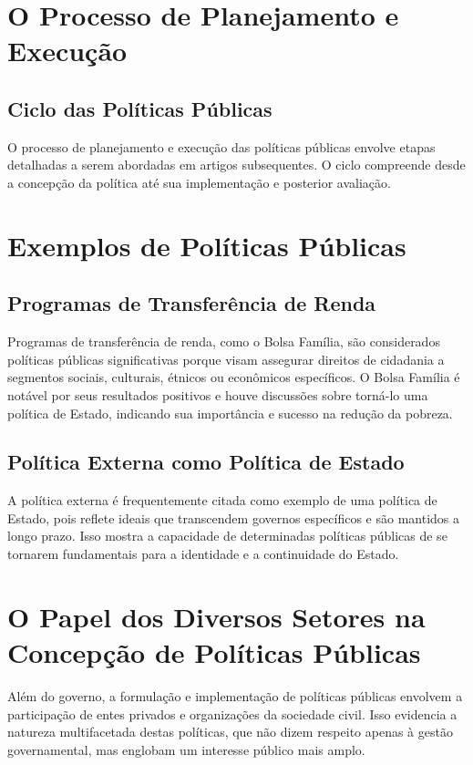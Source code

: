 \documentclass[
   article,       
   12pt,          
   oneside,       
   a4paper,       
   english,       
   brazil,        
   sumario=tradicional
   ]{abntex2}
\begin{document}
\section{O Processo de Planejamento e Execução}
\subsection{Ciclo das Políticas Públicas}
O processo de planejamento e execução das políticas públicas envolve etapas detalhadas a serem abordadas em artigos subsequentes. O ciclo compreende desde a concepção da política até sua implementação e posterior avaliação.

\section{Exemplos de Políticas Públicas}
\subsection{Programas de Transferência de Renda}
Programas de transferência de renda, como o Bolsa Família, são considerados políticas públicas significativas porque visam assegurar direitos de cidadania a segmentos sociais, culturais, étnicos ou econômicos específicos. O Bolsa Família é notável por seus resultados positivos e houve discussões sobre torná-lo uma política de Estado, indicando sua importância e sucesso na redução da pobreza.

\subsection{Política Externa como Política de Estado}
A política externa é frequentemente citada como exemplo de uma política de Estado, pois reflete ideais que transcendem governos específicos e são mantidos a longo prazo. Isso mostra a capacidade de determinadas políticas públicas de se tornarem fundamentais para a identidade e a continuidade do Estado.

\section{O Papel dos Diversos Setores na Concepção de Políticas Públicas}
Além do governo, a formulação e implementação de políticas públicas envolvem a participação de entes privados e organizações da sociedade civil. Isso evidencia a natureza multifacetada destas políticas, que não dizem respeito apenas à gestão governamental, mas englobam um interesse público mais amplo.
\end{document}
